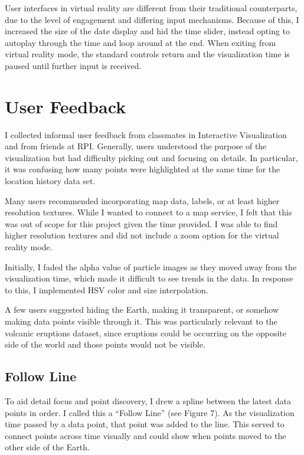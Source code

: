 \documentclass[conference]{acmsiggraph}
\begin{document}
User interfaces in virtual reality are different from their traditional
counterparts, due to the level of engagement and differing input mechanisms.
Because of this, I increased the size of the date display and hid the time
slider, instead opting to autoplay through the time and loop around at the end.
When exiting from virtual reality mode, the standard controls return and the
visualization time is paused until further input is received.


\section{User Feedback}

I collected informal user feedback from classmates in Interactive Visualization
and from friends at RPI. Generally, users understood the purpose of the
visualization but had difficulty picking out and focusing on details. In
particular, it was confusing how many points were highlighted at the same time
for the location history data set.

Many users recommended incorporating map data, labels, or at least higher
resolution textures. While I wanted to connect to a map service, I felt that
this was out of scope for this project given the time provided. I was able to
find higher resolution textures and did not include a zoom option for the
virtual reality mode.

Initially, I faded the alpha value of particle images as they moved away from
the visualization time, which made it difficult to see trends in the data.
In response to this, I implemented HSV color and size interpolation.

A few users suggested hiding the Earth, making it transparent, or somehow
making data points visible through it. This was particularly relevant to the
volcanic eruptions dataset, since eruptions could be occurring on the opposite
side of the world and those points would not be visible.

\subsection{Follow Line}

To aid detail focus and point discovery, I drew a spline between the latest
data points in order. I called this a ``Follow Line'' (see Figure 7). As the
visualization time passed by a data point, that point was added to the line.
This served to connect points across time visually and could show when points
moved to the other side of the Earth.
\end{document}
